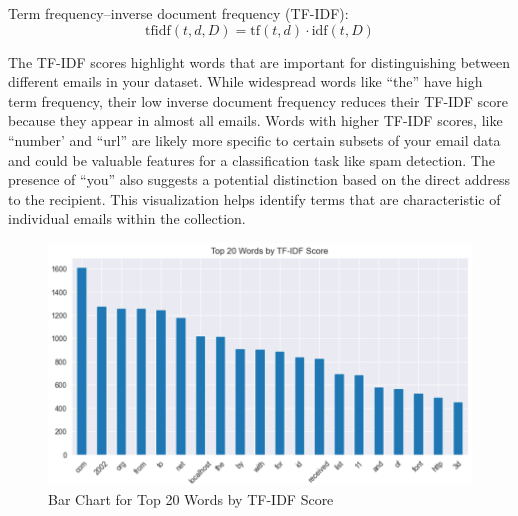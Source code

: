 Term frequency--inverse document frequency (TF-IDF):
\[
    \text{tfidf}(t, d, D) = \text{tf}(t, d) \cdot \text{idf}(t, D)
\]

The TF-IDF scores highlight words that are important for distinguishing between different emails in your dataset.
While widespread words like ``the'' have high term frequency, their low inverse document frequency reduces their TF-IDF score because they appear in almost all emails.
Words with higher TF-IDF scores, like ``number' and ``url'' are likely more specific to certain subsets of your email data and could be valuable features for a classification task like spam detection.
The presence of ``you'' also suggests a potential distinction based on the direct address to the recipient.
This visualization helps identify terms that are characteristic of individual emails within the collection.

\begin{figure}[H]
    \centering
    \includegraphics[width=\linewidth]{images/top_tf_idf_score}
    \caption{Bar Chart for Top 20 Words by TF-IDF Score}
    \label{fig:top_tf_idf_score}
\end{figure}

